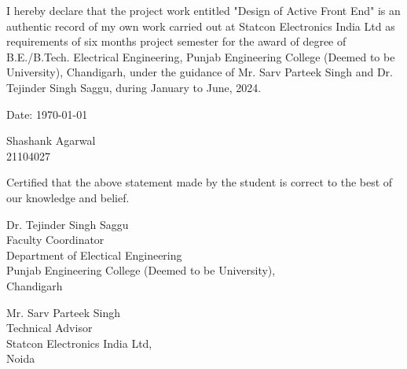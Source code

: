 I hereby declare that the project work entitled "Design of Active Front End" is
an authentic record of my own work carried out at Statcon Electronics India Ltd
as requirements of six months project semester for the award of degree of
B.E./B.Tech. Electrical Engineering, Punjab Engineering College (Deemed to be
University), Chandigarh, under the guidance of Mr. Sarv Parteek Singh and Dr.
Tejinder Singh Saggu, during January to June, 2024.

\vspace*{2.5cm}
\noindent
\begin{minipage}[t]{0.5\textwidth}
    \raggedright
    {Date: {\today}}
\end{minipage}
\hfill
\begin{minipage}[t]{0.5\textwidth}
    \raggedleft
    {Shashank Agarwal\\
    21104027}

\end{minipage}
\vfill

\noindent
Certified that the above statement made by the student is correct to the best of our knowledge and belief.

\vspace*{2cm}

\noindent
\begin{minipage}[t]{0.5\textwidth}
    \raggedright
    Dr. Tejinder Singh Saggu\\
    Faculty Coordinator\\
    Department of Electical Engineering\\
    Punjab Engineering College (Deemed to be University),\\
    Chandigarh
\end{minipage}
\hfill
\begin{minipage}[t]{0.5\textwidth}
    \raggedleft
    Mr. Sarv Parteek Singh\\
    Technical Advisor\\
    Statcon Electronics India Ltd,\\
    Noida

\end{minipage}